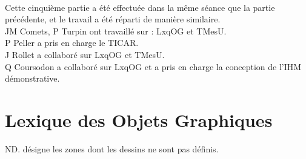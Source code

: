 \documentclass{report}
\begin{document}
\paragraph{}
Cette cinquième partie a été effectuée dans la même séance que la partie précédente, et le travail a été réparti de manière similaire.\\

JM Comets, P Turpin ont travaillé sur : LxqOG et TMesU.\\

P Peller a pris en charge le TICAR.\\

J Rollet a collaboré sur LxqOG et TMesU.\\

Q Coursodon a collaboré sur LxqOG et a pris en charge la conception de l'IHM démonstrative.\\ 



\section{Lexique des Objets Graphiques}

ND. désigne les zones dont les dessins ne sont pas définis.
~~\\
\end{document}

